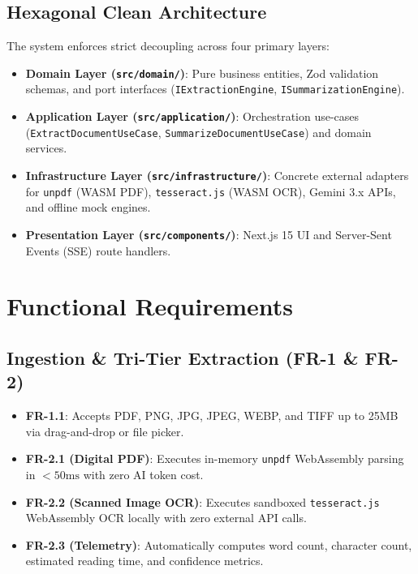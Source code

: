 \documentclass[10pt,twocolumn,a4paper]{article}
\begin{document}
\subsection{Hexagonal Clean Architecture}
The system enforces strict decoupling across four primary layers:
\begin{itemize}[noitemsep]
    \item \textbf{Domain Layer (\texttt{src/domain/})}: Pure business entities, Zod validation schemas, and port interfaces (\texttt{IExtractionEngine}, \texttt{ISummarizationEngine}).
    \item \textbf{Application Layer (\texttt{src/application/})}: Orchestration use-cases (\texttt{ExtractDocumentUseCase}, \texttt{SummarizeDocumentUseCase}) and domain services.
    \item \textbf{Infrastructure Layer (\texttt{src/infrastructure/})}: Concrete external adapters for \texttt{unpdf} (WASM PDF), \texttt{tesseract.js} (WASM OCR), Gemini 3.x APIs, and offline mock engines.
    \item \textbf{Presentation Layer (\texttt{src/components/})}: Next.js 15 UI and Server-Sent Events (SSE) route handlers.
\end{itemize}

\section{Functional Requirements}

\subsection{Ingestion \& Tri-Tier Extraction (FR-1 \& FR-2)}
\begin{itemize}[noitemsep]
    \item \textbf{FR-1.1}: Accepts PDF, PNG, JPG, JPEG, WEBP, and TIFF up to 25MB via drag-and-drop or file picker.
    \item \textbf{FR-2.1 (Digital PDF)}: Executes in-memory \texttt{unpdf} WebAssembly parsing in $< 50\text{ms}$ with zero AI token cost.
    \item \textbf{FR-2.2 (Scanned Image OCR)}: Executes sandboxed \texttt{tesseract.js} WebAssembly OCR locally with zero external API calls.
    \item \textbf{FR-2.3 (Telemetry)}: Automatically computes word count, character count, estimated reading time, and confidence metrics.
\end{itemize}
\end{document}
